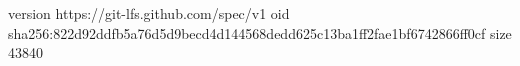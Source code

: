 version https://git-lfs.github.com/spec/v1
oid sha256:822d92ddfb5a76d5d9becd4d144568dedd625c13ba1ff2fae1bf6742866ff0cf
size 43840
